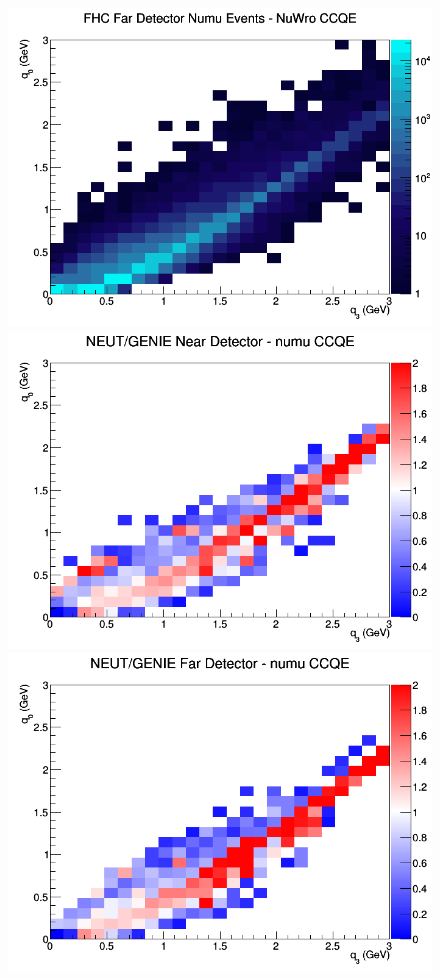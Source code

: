 \begin{figure}[h]
\endminipage
{}
\includegraphics[width=\linewidth]{eff_q0_q3/LAr/CCQE_FHC_FD_numu_q3_q0_NuWro.png}
\endminipage
\newline
{}
\includegraphics[width=\linewidth]{eff_q0_q3/LAr/ratios/CCQE_NEUT_GENIE_numu_near_q3_q0.png}
\endminipage
{}
\includegraphics[width=\linewidth]{eff_q0_q3/LAr/ratios/CCQE_NEUT_GENIE_numu_far_q3_q0.png}

\end{figure}
